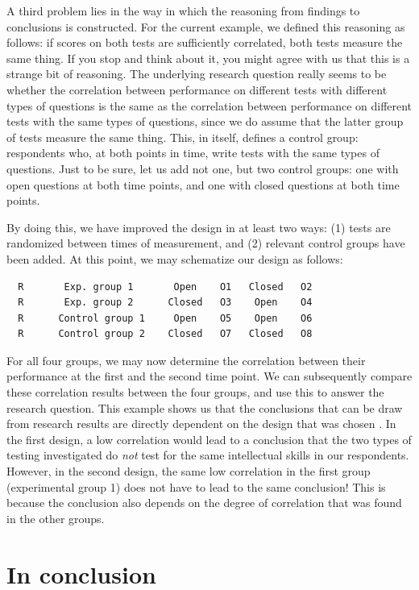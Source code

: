\documentclass[
]{book}
\begin{document}
A third problem lies in the way in which the reasoning from findings to conclusions is constructed. For the current example, we defined this reasoning as follows: if scores on both tests are sufficiently correlated, both tests measure the same thing. If you stop and think about it, you might agree with us that this is a strange bit of reasoning. The underlying research question really seems to be whether the correlation between performance on different tests with different types of questions is the same as the correlation between performance on different tests with the same types of questions, since we do assume that the latter group of tests measure the same thing. This, in itself, defines a control group: respondents who, at both points in time, write tests with the same types of questions. Just to be sure, let us add not one, but two control groups: one with open questions at both time points, and one with closed questions at both time points.

By doing this, we have improved the design in at least two ways: (1) tests are randomized between times of measurement, and (2) relevant control groups have been added. At this point, we may schematize our design as follows:

\begin{verbatim}
  R       Exp. group 1       Open    O1   Closed   O2
  R       Exp. group 2      Closed   O3    Open    O4
  R      Control group 1     Open    O5    Open    O6
  R      Control group 2    Closed   O7   Closed   O8
\end{verbatim}

For all four groups, we may now determine the correlation between their performance at the first and the second time point. We can subsequently compare these correlation results between the four groups, and use this to answer the research question. This example shows us that the conclusions that can be draw from research results are directly dependent on the design that was chosen \citep{Levin99}. In the first design, a low correlation would lead to a conclusion that the two types of testing investigated do \emph{not} test for the same intellectual skills in our respondents. However, in the second design, the same low correlation in the first group (experimental group 1) does not have to lead to the same conclusion! This is because the conclusion also depends on the degree of correlation that was found in the other groups.

\section{In conclusion}\label{in-conclusion}
\end{document}
